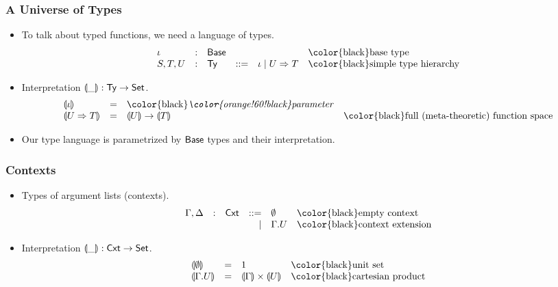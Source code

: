 \documentclass[t,fleqn,usenames,dvipsnames]{beamer}
\newcommand{\mybox}[1]{\mbox{\color{black}#1}}
\renewcommand{\Set}{\mathsf{Set}}
\newcommand{\cAnn}{\color{red!80!black}}%
\renewcommand{\emph}[1]{{\cAnn#1}}
\newcommand{\cType}{\color{orange!60!black}}
\renewcommand{\emph}[1]{\textit{\cType#1}}
\begin{document}
\begin{frame}%
  \frametitle{A Universe of Types}
  \vspace{-3ex}
  \begin{itemize}
  \item To talk about typed functions, we need a language of types.
\[
\begin{array}{lllrll}
  \iota & : & \Base & & &  \mybox{base type} \\
  S,T,U & : & \Ty & ::= & \iota \mid U \To T & \mybox{simple type hierarchy} \\
\end{array}
\]
  \vspace{-2ex}
  \item Interpretation $\denty\_ : \Ty \to \Set$.
\[
\begin{array}{llll}
  \denty{\iota}   & = & \mybox{\emph{parameter}} \\
  \denty{U \To T} & = & \denty U \to \denty T
    & \mybox{full (meta-theoretic) function space}
\end{array}
\]
  \vspace{-2ex}
  \item Our type language is parametrized by $\mathsf{Base}$ types and their
    interpretation.
  \end{itemize}
\end{frame}


\begin{frame}%
  \frametitle{Contexts}
  \vspace{-3ex}
  \begin{itemize}
  \item Types of argument lists (contexts).
\[
\begin{array}{lllrll}
  \Gamma,\Delta & : & \Cxt & ::= & \cempty & \mybox{empty context}
\\ &&& \mid & \Gamma.U & \mybox{context extension}
\end{array}
\]
  \vspace{-2ex}
  \item Interpretation $\denty\_ : \Cxt \to \Set$.
\[
\begin{array}{llll}
  \denty{\cempty} & = & 1
    & \mybox{unit set}
\\
  \denty{\Gamma.U} & = & \denty \Gamma \times \denty U
    & \mybox{cartesian product}
\end{array}
\]
  \end{itemize}
\end{frame}
\end{document}
